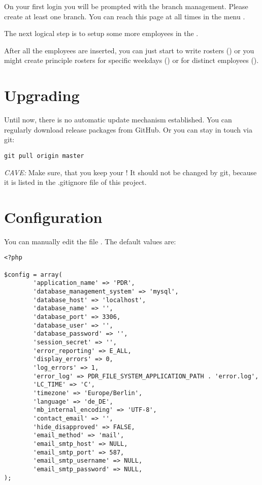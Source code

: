 On your first login you will be prompted with the branch management. 
Please create at least one branch. You can reach this page at all times in the menu .

The next logical step is to setup some more employees in the .

After all the employees are inserted, you can just start to write rosters () or you might create principle rosters for specific weekdays () or for distinct employees ().


\section{Upgrading}
Until now, there is no automatic update mechanism established.
You can regularly download release packages from GitHub. Or you can stay in touch via git:
\begin{lstlisting}
git pull origin master
\end{lstlisting}
\emph{CAVE:} Make sure, that you keep your ! It should not be changed by git, because it is listed in the .gitignore file of this project.


\section{Configuration}
You can manually edit the file .
The default values are:
\begin{lstlisting}
<?php

$config = array(
        'application_name' => 'PDR',
        'database_management_system' => 'mysql',
        'database_host' => 'localhost',
        'database_name' => '',
        'database_port' => 3306,
        'database_user' => '',
        'database_password' => '',
        'session_secret' => '',
        'error_reporting' => E_ALL,
        'display_errors' => 0,
        'log_errors' => 1,
        'error_log' => PDR_FILE_SYSTEM_APPLICATION_PATH . 'error.log',
        'LC_TIME' => 'C',
        'timezone' => 'Europe/Berlin',
        'language' => 'de_DE',
        'mb_internal_encoding' => 'UTF-8',
        'contact_email' => '',
        'hide_disapproved' => FALSE,
        'email_method' => 'mail',
        'email_smtp_host' => NULL,
        'email_smtp_port' => 587,
        'email_smtp_username' => NULL,
        'email_smtp_password' => NULL,
);
\end{lstlisting}


